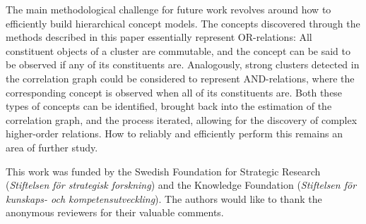 \documentclass{kais}
\begin{document}
The main methodological challenge for future work revolves around how to efficiently build hierarchical concept models.
The concepts discovered through the methods described in this paper essentially represent OR-relations: All constituent
objects of a cluster are commutable, and the concept can be said to be observed if any of its constituents
are. Analogously, strong clusters detected in the correlation graph could be considered to represent AND-relations,
where the corresponding concept is observed when all of its constituents are. Both these types of
concepts can be identified, brought back into the estimation of the correlation graph, and the process
iterated, allowing for the discovery of complex higher-order relations. How to reliably and efficiently perform this
remains an area of further study.

\begin{acknowledgements}
This work was funded by the Swedish Foundation for Strategic Research (\emph{Stiftelsen f\"or strategisk forskning}) 
and the Knowledge Foundation (\emph{Stiftelsen f\"or kunskaps- och kompetensutveckling}). 
The authors would like to thank the anonymous reviewers for their valuable comments.\end{acknowledgements}



\end{document}
